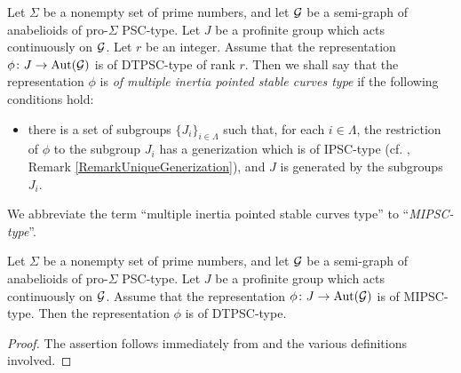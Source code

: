 \begin{defn}
  Let $\Sigma$ be a nonempty set of prime numbers, and let $\mathcal{G}$ be a semi-graph of anabelioids of pro-$\Sigma$ PSC-type. Let $J$ be a profinite group which acts continuously on $\mathcal{G}$. Let $r$ be an integer. Assume that the representation $\phi \colon J \to \mathrm{Aut}(\mathcal{G})$ is of DTPSC-type of rank $r$. Then we shall say that the representation $\phi$ is \emph{of multiple inertia pointed stable curves type} if the following conditions hold:
  \begin{itemize}
    \item there is a set of subgroups $\{J_i\}_{i \in \Lambda}$ such that, for each $i \in \Lambda$, the restriction of $\phi$ to the subgroup $J_i$ has a generization which is of IPSC-type (cf. \cite[Definition 2.4, (i)]{NodNon}, Remark \ref{RemarkUniqueGenerization}), and $J$ is generated by the subgroups $J_i$.
  \end{itemize}
  We abbreviate the term ``multiple inertia pointed stable curves type'' to ``\emph{MIPSC-type}''.
\end{defn}

\begin{lem}
  Let $\Sigma$ be a nonempty set of prime numbers, and let $\mathcal{G}$ be a semi-graph of anabelioids of pro-$\Sigma$ PSC-type. Let $J$ be a profinite group which acts continuously on $\mathcal{G}$. Assume that the representation $\phi \colon J \to \mathrm{Aut}(\mathcal{G})$ is of MIPSC-type. Then the representation $\phi$ is of DTPSC-type.
\end{lem}
\begin{proof}
  The assertion follows immediately from \cite[Remark 2.4.2]{NodNon} and the various definitions involved.
\end{proof}




